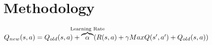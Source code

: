 \section{Methodology}

\(Q_{new}(s,a)=Q_{old}(s,a)+\overbrace{\alpha}^{\mathclap{\text{Learning Rate}}}(R(s,a)+\gamma MaxQ(s',a')+Q_{old}(s,a))\)